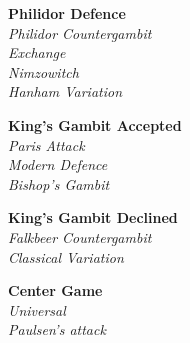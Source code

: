 \hspace{5mm}
\begin{minipage}[t]{.175\linewidth}
\begin{center}
\textbf{Philidor Defence}\\
\textit{Philidor Countergambit}\\
\textit{Exchange}\\
\textit{Nimzowitch}\\
\textit{Hanham Variation}
\end{center}
\raggedright
\begin{center}
\phantom{\scalebox{.560}{\showboard}}
\end{center}
\vspace{10mm}
\end{minipage}
\hspace{5mm}
\begin{minipage}[t]{.175\linewidth}
\begin{center}
\textbf{King's Gambit Accepted}\\
\textit{Paris Attack}\\
\textit{Modern Defence}\\
\textit{Bishop's Gambit}
\end{center}
\raggedright
\begin{center}
\phantom{\scalebox{.560}{\showboard}}
\end{center}
\vspace{10mm}
\end{minipage}
\newline
\begin{minipage}[t]{.175\linewidth}
\begin{center}
\textbf{King's Gambit Declined}\\
\textit{Falkbeer Countergambit}\\
\textit{Classical Variation}
\end{center}
\raggedright
\begin{center}
\phantom{\scalebox{.560}{\showboard}}
\end{center}
\vspace{20mm}
\end{minipage}
\hspace{5mm}
\begin{minipage}[t]{.175\linewidth}
\begin{center}
\textbf{Center Game}\\
\textit{Universal}\\
\textit{Paulsen's attack}
\end{center}
\raggedright
\begin{center}
\phantom{\scalebox{.560}{\showboard}}
\end{center}
\vspace{20mm}
\end{minipage}
